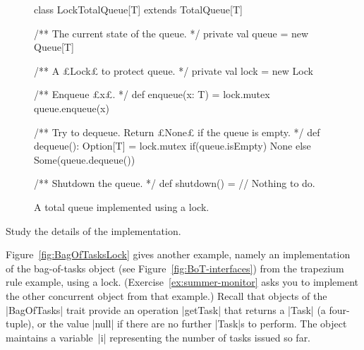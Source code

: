 
\begin{figure}
\begin{scala}
class LockTotalQueue[T] extends TotalQueue[T]{
  /** The current state of the queue. */
  private val queue = new Queue[T]

  /** A £Lock£ to protect queue. */
  private val lock = new Lock

  /** Enqueue £x£. */
  def enqueue(x: T) = lock.mutex{ queue.enqueue(x) }

  /** Try to dequeue.  Return £None£ if the queue is empty. */
  def dequeue(): Option[T] = lock.mutex{ 
    if(queue.isEmpty) None else Some(queue.dequeue()) 
  }

  /** Shutdown the queue. */
  def shutdown() = {} // Nothing to do.
}
\end{scala}
\caption{A total queue implemented using a lock.}
\label{fig:LockTotalQueue}
\end{figure}


\begin{instruction}
Study the details of the implementation.
\end{instruction}


Figure~\ref{fig:BagOfTasksLock} gives another example, namely an
implementation of the bag-of-tasks object (see
Figure~\ref{fig:BoT-interfaces}) from the trapezium rule example, using a
lock.  (Exercise~\ref{ex:summer-monitor} asks you to implement the other
concurrent object from that example.)  Recall that objects of the |BagOfTasks|
trait provide an operation |getTask| that returns a |Task| (a four-tuple), or
the value |null| if there are no further |Task|s to perform.  The object
maintains a variable~|i| representing the number of tasks issued so far.


